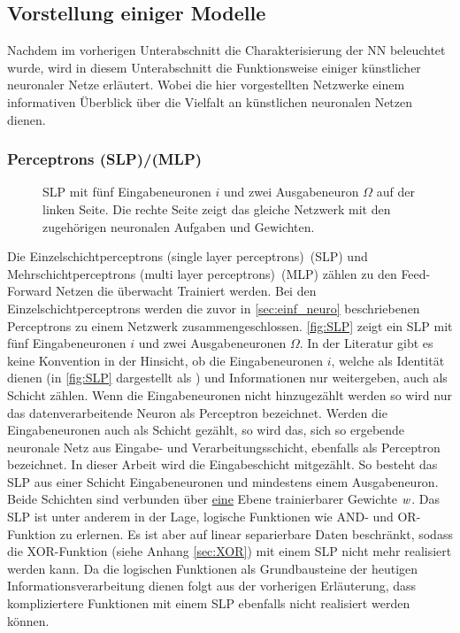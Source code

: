 \subsection{Vorstellung einiger Modelle}\label{sec:ANN-Modelle}
Nachdem im vorherigen Unterabschnitt die Charakterisierung der NN beleuchtet wurde, wird in diesem Unterabschnitt die Funktionsweise einiger künstlicher neuronaler Netze erläutert. Wobei die hier vorgestellten Netzwerke einem informativen Überblick über die Vielfalt an künstlichen neuronalen Netzen dienen.

\subsubsection{Perceptrons (SLP)/(MLP)}
\begin{figure}[!htb]
    \centering
        
    \caption[Darstellung eines SLP]{SLP mit fünf Eingabeneuronen $i$ und zwei Ausgabeneuron $\Omega$ auf der linken Seite. Die rechte Seite zeigt das gleiche Netzwerk mit den zugehörigen neuronalen Aufgaben und Gewichten.}
    \label{fig:SLP}
\end{figure}
Die Einzelschichtperceptrons (single layer perceptrons)~(\gls{SLP}) und Mehrschichtperceptrons (multi layer perceptrons)~(\gls{MLP}) zählen zu den Feed-Forward Netzen die überwacht Trainiert werden. Bei den Einzelschichtperceptrons werden die zuvor in \autoref{sec:einf_neuro} beschriebenen Perceptrons zu einem Netzwerk zusammengeschlossen. \autoref{fig:SLP} zeigt ein SLP mit fünf Eingabeneuronen $i$ und zwei Ausgabeneuronen $\Omega$. In der Literatur gibt es keine Konvention in der Hinsicht, ob die Eingabeneuronen $i$, welche als Identität dienen (in \autoref{fig:SLP} dargestellt als ) und Informationen nur weitergeben, auch als Schicht zählen. Wenn die Eingabeneuronen nicht hinzugezählt werden so wird nur das datenverarbeitende Neuron  als Perceptron bezeichnet. Werden die Eingabeneuronen auch als Schicht gezählt, so wird das, sich so ergebende neuronale Netz aus Eingabe- und Verarbeitungsschicht, ebenfalls als Perceptron bezeichnet. In dieser Arbeit wird die Eingabeschicht mitgezählt. So besteht das SLP aus einer Schicht Eingabeneuronen und mindestens einem Ausgabeneuron. Beide Schichten sind verbunden über \underline{eine} Ebene trainierbarer Gewichte $\text{\textit{w}}$. Das SLP ist unter anderem in der Lage, logische Funktionen wie AND- und OR-Funktion zu erlernen. Es ist aber auf linear separierbare Daten beschränkt, sodass die XOR-Funktion (siehe Anhang \ref{sec:XOR}) mit einem SLP nicht mehr realisiert werden kann. Da die logischen Funktionen als Grundbausteine der heutigen Informationsverarbeitung dienen folgt aus der vorherigen Erläuterung, dass kompliziertere Funktionen mit einem SLP ebenfalls nicht realisiert werden können.
